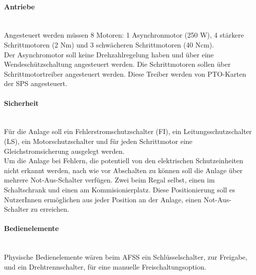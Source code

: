     \paragraph{Antriebe}\mbox{}\\
    Angesteuert werden müssen 8 Motoren: 1 Asynchronmotor (250 W), 4 stärkere Schrittmotoren (2 Nm) und 3 schwächeren Schrittmotoren (40 Ncm). \\
    Der Asynchromotor soll keine Drehzahlregelung haben und über eine Wendeschützschaltung angesteuert werden. Die Schrittmotoren sollen über Schrittmotortreiber angesteuert werden. Diese Treiber werden von PTO-Karten der SPS angesteuert.

    \paragraph{Sicherheit}\mbox{}\\
    Für die Anlage soll ein Fehlerstromschutzschalter (FI), ein Leitungsschutzschalter (LS), ein Motorschutzschalter und für jeden Schrittmotor eine Gleichstromsicherung ausgelegt werden.\\ 
    Um die Anlage bei Fehlern, die potentiell von den elektrischen Schutzeinheiten nicht erkannt werden, nach wie vor Abschalten zu können soll die Anlage über mehrere Not-Aus-Schalter verfügen. Zwei beim Regal selbst, einen im Schaltschrank und einen am Kommisionierplatz. Diese Positionierung soll es NutzerInnen ermöglichen aus jeder Position an der Anlage, einen Not-Aus-Schalter zu erreichen.

    \paragraph{Bedienelemente}\mbox{}\\
    Physische Bedienelemente wären beim AFSS ein Schlüsselschalter, zur Freigabe, und ein Drehtrennschalter, für eine manuelle Freischaltungsoption.

